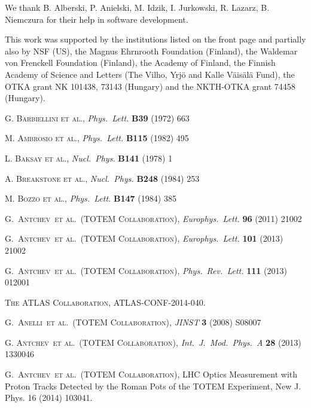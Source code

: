 \documentclass[3p,twocolumn]{elsarticle}
\def\etal{et al.}
\def\Name#1{\textsc{#1}, }
\def\REVIEW#1#2#3#4{{\it #1} {\bf #2} (#3) #4}
\begin{document}
We thank B. Alberski, P. Anielski, M. Idzik, I. Jurkowski, R. Lazarz, 
B. Niemczura for their help in software development.

This work was supported by the institutions listed on the front page and 
partially also by NSF (US), the Magnus Ehrnrooth Foundation (Finland), the 
Waldemar von Frenckell Foundation (Finland), the Academy of Finland, the 
Finnish Academy of Science and Letters (The Vilho, Yrj\"o and Kalle 
V\"ais\"al\"a Fund), the OTKA grant NK 101438, 73143 (Hungary) and the 
NKTH-OTKA grant 74458 (Hungary).


\begin{thebibliography}{99}
%
 \Name{G. Barbiellini et al.} \REVIEW{Phys.~Lett.}{B39}{1972}{663}

 \Name{M. Ambrosio et al.} \REVIEW{Phys.~Lett.}{B115}{1982}{495}

 \Name{L. Baksay et al.} \REVIEW{Nucl.~Phys.}{B141}{1978}{1}

 \Name{A. Breakstone et al.} \REVIEW{Nucl.~Phys.}{B248}{1984}{253}

 \Name{M. Bozzo et al.} \REVIEW{Phys.~Lett.}{B147}{1984}{385}

	\Name{G.~Antchev~\etal{}~(TOTEM Collaboration)}
	\REVIEW{Europhys.~Lett.}{96}{2011}{21002}

	\Name{G.~Antchev~\etal{}~(TOTEM Collaboration)}
	\REVIEW{Europhys.~Lett.}{101}{2013}{21002}

	\Name{G.~Antchev~\etal{}~(TOTEM Collaboration)}
	\REVIEW{Phys.~Rev.~Lett.}{111}{2013}{012001}

 \Name{The ATLAS Collaboration} ATLAS-CONF-2014-040.

	\Name{G.~Anelli~\etal{}~(TOTEM Collaboration)}
	\REVIEW{JINST}{3}{2008}{S08007}


	\Name{G. Antchev~\etal{}~(TOTEM Collaboration)}
	\REVIEW{Int.~J.~Mod.~Phys.~A}{28}{2013}{1330046}

	\Name{G.~Antchev~\etal{}~(TOTEM Collaboration)}
	LHC Optics Measurement with Proton Tracks Detected by the Roman Pots of the TOTEM Experiment, 
	New J. Phys. 16 (2014) 103041.


\end{thebibliography}
\end{document}
